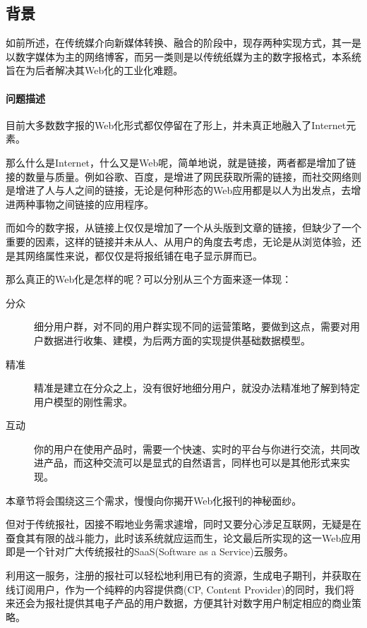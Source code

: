 
\subsection{背景}
如前所述，在传统媒介向新媒体转换、融合的阶段中，现存两种实现方式，其一是以数字媒体为主的网络博客，而另一类则是以传统纸媒为主的数字报格式，本系统旨在为后者解决其Web化的工业化难题。

\paragraph{问题描述}

目前大多数数字报的Web化形式都仅停留在了形上，并未真正地融入了Internet元素。

那么什么是Internet，什么又是Web呢，简单地说，就是链接，两者都是增加了链接的数量与质量。例如谷歌、百度，是增进了网民获取所需的链接，而社交网络则是增进了人与人之间的链接，无论是何种形态的Web应用都是以人为出发点，去增进两种事物之间链接的应用程序。

而如今的数字报，从链接上仅仅是增加了一个从头版到文章的链接，但缺少了一个重要的因素，这样的链接并未从人、从用户的角度去考虑，无论是从浏览体验，还是其网络属性来说，都仅仅是将报纸铺在电子显示屏而已。

\noindent
那么真正的Web化是怎样的呢？可以分别从三个方面来逐一体现：
\begin{description}
	\item[分众] 细分用户群，对不同的用户群实现不同的运营策略，要做到这点，需要对用户数据进行收集、建模，为后两方面的实现提供基础数据模型。
	\item[精准] 精准是建立在分众之上，没有很好地细分用户，就没办法精准地了解到特定用户模型的刚性需求。
	\item[互动] 你的用户在使用产品时，需要一个快速、实时的平台与你进行交流，共同改进产品，而这种交流可以是显式的自然语言，同样也可以是其他形式来实现。
\end{description}

\noindent
本章节将会围绕这三个需求，慢慢向你揭开Web化报刊的神秘面纱。

\indent
但对于传统报社，因接不暇地业务需求遽增，同时又要分心涉足互联网，无疑是在蚕食其有限的战斗能力，此时该系统就应运而生，论文最后所实现的这一Web应用即是一个针对广大传统报社的SaaS(Software as a Service)云服务。

\indent
利用这一服务，注册的报社可以轻松地利用已有的资源，生成电子期刊，并获取在线订阅用户，作为一个纯粹的内容提供商(CP, Content Provider)的同时，我们将来还会为报社提供其电子产品的用户数据，方便其针对数字用户制定相应的商业策略。

